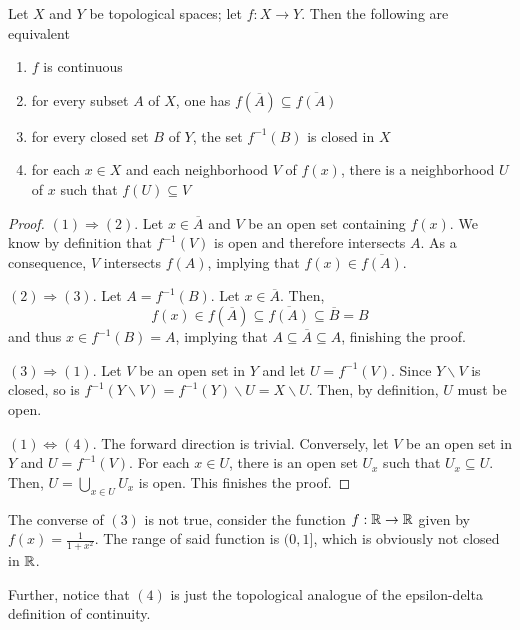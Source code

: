 \begin{theorem}
    Let $X$ and $Y$ be topological spaces; let $f:X\to Y$. Then the following are equivalent 
    \begin{enumerate}
        \item $f$ is continuous 
        \item for every subset $A$ of $X$, one has $f(\overline{A})\subseteq\overline{f(A)}$ 
        \item for every closed set $B$ of $Y$, the set $f^{-1}(B)$ is closed in $X$ 
        \item for each $x\in X$ and each neighborhood $V$ of $f(x)$, there is a neighborhood $U$ of $x$ such that $f(U)\subseteq V$
    \end{enumerate}
\end{theorem}
\begin{proof}
    $(1)\Rightarrow(2)$. Let $x\in\overline{A}$ and $V$ be an open set containing $f(x)$. We know by definition that $f^{-1}(V)$ is open and therefore intersects $A$. As a consequence, $V$ intersects $f(A)$, implying that $f(x)\in\overline{f(A)}$.

    $(2)\Rightarrow(3)$. Let $A = f^{-1}(B)$. Let $x\in\overline{A}$. Then, 
    \begin{equation*}
        f(x)\in f(\overline{A})\subseteq\overline{f(A)}\subseteq\overline{B} = B
    \end{equation*}
    and thus $x\in f^{-1}(B) = A$, implying that $A\subseteq\overline{A}\subseteq A$, finishing the proof.

    $(3)\Rightarrow(1)$. Let $V$ be an open set in $Y$ and let $U = f^{-1}(V)$. Since $Y\backslash V$ is closed, so is $f^{-1}(Y\backslash V) = f^{-1}(Y)\backslash U = X\backslash U$. Then, by definition, $U$ must be open.

    $(1)\Leftrightarrow(4)$. The forward direction is trivial. Conversely, let $V$ be an open set in $Y$ and $U = f^{-1}(V)$. For each $x\in U$, there is an open set $U_x$ such that $U_x\subseteq U$. Then, $U = \bigcup_{x\in U}U_x$ is open. This finishes the proof.
\end{proof}

\begin{mdframed}
    The converse of $(3)$ is not true, consider the function $f:\mathbb{R}\to\mathbb{R}$ given by $f(x) = \frac{1}{1 + x^2}$. The range of said function is $(0,1]$, which is obviously not closed in $\mathbb{R}$.

    Further, notice that $(4)$ is just the topological analogue of the epsilon-delta definition of continuity.
\end{mdframed}

